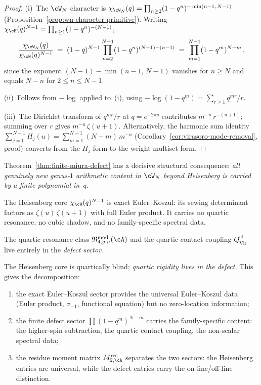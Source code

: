 \begin{proof}
(i)~The $\cW_N$ character is
$\chi_{\cW_N}(q) = \prod_{n \geq 2}(1 - q^n)^{-\min(n-1,\,N-1)}$
(Proposition~\ref{prop:wn-character-primitive}). Writing
$\chi_\cH(q)^{N-1} = \prod_{n \geq 1}(1 - q^n)^{-(N-1)}$,
\[
\frac{\chi_{\cW_N}(q)}{\chi_\cH(q)^{N-1}}
\;=\;
(1 - q)^{N-1}
\prod_{n=2}^{N-1}(1 - q^n)^{(N-1) - (n-1)}
\;=\;
\prod_{m=1}^{N-1}(1 - q^m)^{N-m}\,,
\]
since the exponent $(N{-}1) - \min(n{-}1,\,N{-}1)$ vanishes
for $n \geq N$ and equals $N{-}n$ for $2 \leq n \leq N{-}1$.

(ii)~Follows from $-\log$ applied to~(i), using
$-\log(1 - q^m) = \sum_{r \geq 1}q^{mr}/r$.

(iii)~The Dirichlet transform of $q^{mr}/r$ at $q = e^{-2\pi y}$
contributes $m^{-u}\,r^{-(u+1)}$; summing over $r$
gives $m^{-u}\,\zeta(u{+}1)$. Alternatively, the harmonic sum
identity
$\sum_{j=1}^{N-1}H_j(u) = \sum_{m=1}^{N-1}(N{-}m)\,m^{-u}$
(Corollary~\ref{cor:virasoro-mode-removal}, proof)
converts from the $H_j$-form to the weight-multiset form.
\end{proof}

\begin{remark}%
\label{rem:finite-defect-principle}%
%
Theorem~\ref{thm:finite-miura-defect} has a decisive
structural consequence:
\emph{all genuinely new genus-$1$ arithmetic content
in $\cW_N$ beyond Heisenberg is carried by a finite
polynomial in~$q$.}

The Heisenberg core $\chi_\cH(q)^{N-1}$ is exact
Euler--Koszul: its sewing determinant factors as
$\zeta(u)\,\zeta(u{+}1)$ with full Euler product.
It carries no quartic resonance, no cubic shadow, and no
family-specific spectral data.

The quartic resonance class
$\mathfrak{R}_{4,g,n}^{\mathrm{mod}}(\cA)$ and the
quartic contact coupling $Q_{\mathrm{Vir}}^{\mathrm{ct}}$
live entirely in the \emph{defect sector}.

The Heisenberg core is quartically blind;
\emph{quartic rigidity lives in the defect.}
This gives the decomposition:
\begin{enumerate}[label=\textup{(\roman*)}]
\item
the exact Euler--Koszul sector provides the
universal Euler--Koszul data (Euler product, $\sigma_{-1}$,
functional equation) but no zero-location information;
\item
the finite defect sector $\prod(1 - q^m)^{N-m}$
carries the family-specific content: the higher-spin
subtraction, the quartic contact coupling, the
non-scalar spectral data;
\item
the residue moment matrix $M_{2,\cA}^{\mathrm{res}}$
separates the two sectors: the Heisenberg entries are
universal, while the defect entries carry the
on-line/off-line distinction.
\end{enumerate}
\end{remark}

